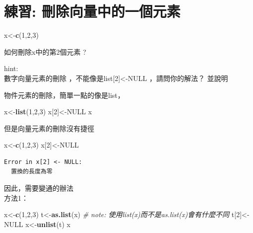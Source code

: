 \documentclass[]{book}
\newenvironment{Shaded}{\begin{snugshade}}{\end{snugshade}}
\newcommand{\CommentTok}[1]{\textcolor[rgb]{0.56,0.35,0.01}{\textit{#1}}}
\newcommand{\DecValTok}[1]{\textcolor[rgb]{0.00,0.00,0.81}{#1}}
\newcommand{\KeywordTok}[1]{\textcolor[rgb]{0.13,0.29,0.53}{\textbf{#1}}}
\newcommand{\NormalTok}[1]{#1}
\newcommand{\OtherTok}[1]{\textcolor[rgb]{0.56,0.35,0.01}{#1}}
\theoremstyle{definition}
\theoremstyle{definition}
\theoremstyle{definition}
\theoremstyle{remark}
\begin{document}
\hypertarget{-}{%
\section{練習: 刪除向量中的一個元素}\label{-}}

\begin{Shaded}
\begin{Highlighting}[]
\NormalTok{x<-}\KeywordTok{c}\NormalTok{(}\DecValTok{1}\NormalTok{,}\DecValTok{2}\NormalTok{,}\DecValTok{3}\NormalTok{)}
\end{Highlighting}
\end{Shaded}

如何刪除x中的第2個元素 ?

hint:\\
數字向量元素的刪除 ，不能像是list{[}2{]}\textless{}-NULL
，請問你的解法？ 並說明

物件元素的刪除，簡單一點的像是list，

\begin{Shaded}
\begin{Highlighting}[]
\NormalTok{x<-}\KeywordTok{list}\NormalTok{(}\DecValTok{1}\NormalTok{,}\DecValTok{2}\NormalTok{,}\DecValTok{3}\NormalTok{)}
\NormalTok{x[}\DecValTok{2}\NormalTok{]<-}\OtherTok{NULL}
\NormalTok{x}
\end{Highlighting}
\end{Shaded}

但是向量元素的刪除沒有捷徑

\begin{Shaded}
\begin{Highlighting}[]
\NormalTok{x<-}\KeywordTok{c}\NormalTok{(}\DecValTok{1}\NormalTok{,}\DecValTok{2}\NormalTok{,}\DecValTok{3}\NormalTok{)}
\NormalTok{x[}\DecValTok{2}\NormalTok{]<-}\OtherTok{NULL}
\end{Highlighting}
\end{Shaded}

\begin{verbatim}
Error in x[2] <- NULL:
  置換的長度為零
\end{verbatim}

因此，需要變通的辦法\\
方法1：

\begin{Shaded}
\begin{Highlighting}[]
\NormalTok{x<-}\KeywordTok{c}\NormalTok{(}\DecValTok{1}\NormalTok{,}\DecValTok{2}\NormalTok{,}\DecValTok{3}\NormalTok{)}
\NormalTok{t<-}\KeywordTok{as.list}\NormalTok{(x) }\CommentTok{# note: 使用list(x)而不是as.list(x)會有什麼不同}
\NormalTok{t[}\DecValTok{2}\NormalTok{]<-}\OtherTok{NULL}
\NormalTok{x<-}\KeywordTok{unlist}\NormalTok{(t)}
\NormalTok{x}
\end{Highlighting}
\end{Shaded}
\end{document}
